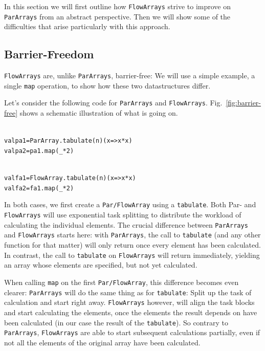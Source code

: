 \documentclass[runningheads,a4paper,fleqn]{llncs}
\begin{document}
In this section we will first outline how \texttt{FlowArrays} strive to improve
on \texttt{ParArrays} from an abstract perspective. Then we will show some of
the difficulties that arise particularly with this approach.

\subsection{Barrier-Freedom}
\texttt{FlowArrays} are, unlike \texttt{ParArrays}, barrier-free: We will use a simple
example, a single \texttt{map} operation, to show how these two
datastructures differ.

Let's consider the following code for \texttt{ParArrays} and
\texttt{FlowArrays}. Fig.~\ref{fig:barrier-free} shows a schematic
illustration of what is going on.

\noindent
\begin{minipage}[t]{.5\textwidth}
\begin{alltt}
{\scriptsize
val pa1 = ParArray.tabulate(n)(x => x*x)
val pa2 = pa1.map(_ * 2)
}
\end{alltt}
\end{minipage}
\begin{minipage}[t]{.5\textwidth}
\begin{alltt}
{\scriptsize
val fa1 = FlowArray.tabulate(n)(x => x*x)
val fa2 = fa1.map(_ * 2)
}
\end{alltt}
\end{minipage}

In both cases, we first create a \texttt{Par/FlowArray} using a
\texttt{tabulate}. Both Par- and \texttt{FlowArrays} will use exponential task
splitting \cite{collect11,cong08} to distribute the workload of
calculating the individual elements. The crucial difference between
\texttt{ParArrays} and \texttt{FlowArrays} starts here: with \texttt{ParArrays}, the call to
\texttt{tabulate} (and any other function for that matter) will only
return once every element has been calculated. In contrast, the call
to \texttt{tabulate} on \texttt{FlowArrays} will return immediately, yielding
an array whose elements are specified, but not yet calculated.

When calling \texttt{map} on the first \texttt{Par/FlowArray}, this difference
becomes even clearer: \texttt{ParArrays} will do the same thing as for
\texttt{tabulate}: Split up the task of calculation and start right
away. \texttt{FlowArrays} however, will align the task blocks and start
calculating the elements, once the elements the result depends on have
been calculated (in our case the result of the \texttt{tabulate}). So
contrary to \texttt{ParArrays}, \texttt{FlowArrays} are able to start subsequent
calculations partially, even if not all the elements of the original
array have been calculated.
\end{document}
